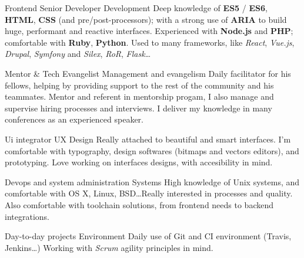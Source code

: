 
\begin{cventries}

  \cventry
    {Frontend Senior Developer}
    {Development}
    {}
    {}
    {
      Deep knowledge of \textbf{ES5} / \textbf{ES6}, \textbf{HTML}, \textbf{CSS} (and pre/post-processors); with a strong use of \textbf{ARIA} to build huge, performant and reactive interfaces. Experienced with \textbf{Node.js} and \textbf{PHP}; comfortable with \textbf{Ruby}, \textbf{Python}. Used to many frameworks, like \textit{React}, \textit{Vue.js}, \textit{Drupal}, \textit{Symfony} and \textit{Silex}, \textit{RoR}, \textit{Flask}…
    }
  \vspace{\msetCventryBottomSkip}

  \cventry
    {Mentor \& Tech Evangelist}
    {Management and evangelism}
    {}
    {}
    {
      Daily facilitator for his fellows, helping by providing support to the rest of the community and his teammates. Mentor and referent in mentorship progam, I also manage and supervise hiring processes and interviews. I deliver my knowledge in many conferences as an experienced speaker.
    }
  \vspace{\msetCventryBottomSkip}

  \cventry
    {Ui integrator}
    {UX \cdotp Design}
    {}
    {}
    {
      Really attached to beautiful and smart interfaces. I'm comfortable with typography, design softwares (bitmaps and vectors editors), and prototyping. Love working on interfaces designs, with accesibility in mind.
    }
  \vspace{\msetCventryBottomSkip}

  \cventry
    {Devops and system administration}
    {Systems}
    {}
    {}
    {
      High knowledge of Unix systems, and comfortable with OS X, Linux, BSD\dots Really interested in processes and quality. Also comfortable with toolchain solutions, from frontend needs to backend integrations.
    }
  \vspace{\msetCventryBottomSkip}

  \cventry
    {Day-to-day projects}
    {Environment}
    {}
    {}
    {
      Daily use of Git and CI environment (Travis, Jenkins\dots) Working with \textit{Scrum} agility principles in mind.
    }

\end{cventries}
